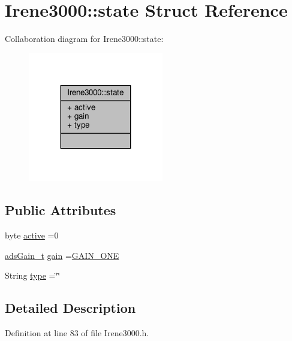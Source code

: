 \hypertarget{struct_irene3000_1_1state}{}\section{Irene3000\+:\+:state Struct Reference}
\label{struct_irene3000_1_1state}


Collaboration diagram for Irene3000\+:\+:state\+:\nopagebreak
\begin{figure}[H]
\begin{center}
\leavevmode
\includegraphics[width=167pt]{d8/d72/struct_irene3000_1_1state__coll__graph}
\end{center}
\end{figure}
\subsection*{Public Attributes}
\begin{DoxyCompactItemize}
\item 
byte \hyperlink{struct_irene3000_1_1state_af7ff649f20b9a2fb6ca0f949ee9a25ce}{active} =0
\item 
\hyperlink{_cool_adafruit___a_d_s1015_8h_a3d6c0e15829a207b9155890811fa4781}{ads\+Gain\+\_\+t} \hyperlink{struct_irene3000_1_1state_a1ecf69d38cb31ecaf6b3602a3f3e93cb}{gain} =\hyperlink{_cool_adafruit___a_d_s1015_8h_a3d6c0e15829a207b9155890811fa4781ab6b0b520637e016e297110bebeb23a54}{G\+A\+I\+N\+\_\+\+O\+NE}
\item 
String \hyperlink{struct_irene3000_1_1state_a9897a7e02727db6351d44006eec73799}{type} =\char`\"{}\char`\"{}
\end{DoxyCompactItemize}


\subsection{Detailed Description}


Definition at line 83 of file Irene3000.\+h.



